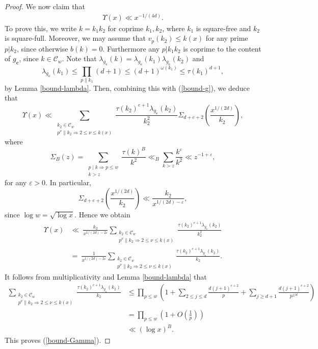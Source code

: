 \documentclass[reqno, 11pt]{amsart}
\renewcommand{\leq}{\leqslant}
\renewcommand{\geq}{\geqslant}
\theoremstyle{definition}
\theoremstyle{definition}
\renewcommand{\geq}{\geqslant}
\renewcommand{\leq}{\leqslant}
\newcommand{\eps}{\varepsilon}
\newcommand{\cc}{\mathbf{c}}
\newcommand{\CCC}{\mathcal{C}}
\numberwithin{equation}{section}
\begin{document}
\begin{proof}
    We now claim that
    \begin{align}\label{bound-Gamma}
    	\Upsilon(x) \ll x^{-1/(4d)}.
    \end{align}
    To prove this, we write $k = k_1k_2$ for coprime $k_1, k_2$, where $k_1$ is square-free and $k_2$ is square-full. Moreover, we may assume that $v_p(k_2) \leq k(x)$ for any prime $p | k_2$, since otherwise $b(k) = 0$. Furthermore any $p | k_1k_2$ is coprime to the content of $g_\cc$, since $k \in \CCC_w$. Note that $\lambda_{g_\cc}(k) = \lambda_{g_\cc}(k_1) \lambda_{g_\cc}(k_2)$ and
    $$\lambda_{g_\cc}(k_1) \leq \prod_{p \| k_1 }(d+1) \leq (d+1)^{\omega(k_1)} \leq \tau(k_1)^{d+1},$$
    by Lemma \ref{bound-lambda}. Then, combining this with (\ref{bound-g}), we deduce that
    $$\Upsilon(x)\ll \sum_{\substack{k_2\in \mathcal{C}_w\\p^\nu\| k_2\Rightarrow 2\leq \nu\leq k(x)}} \frac{\tau(k_2)^{e+1}\lambda_{g_\cc}(k_2)}{k_2^2} \Sigma_{d+e+2}\left(\frac{x^{1/(2d)}}{k_2}\right),$$
where 
$$
\Sigma_B(z)=\sum_{\substack{p\mid k \Rightarrow p\leq w\\ k>z}} \frac{\tau(k)^{B}}{k^2} \ll_B \sum_{k > z} \frac{k^\eps}{k^2} \ll z^{-1+\eps}, $$
for any $\eps > 0$.
In particular, 
$$\Sigma_{d+e+2}\left(\frac{x^{1/(2d)}}{k_2}\right) \ll \frac{k_2}{x^{1/(2d)-\eps}} ,$$
since $\log w = \sqrt{\log x}$. 
Hence we obtain
\begin{align*}
	\Upsilon(x) & \ll \ \frac{k_2}{x^{1/(2d) - 2\eps}} 
 \sum_{\substack{k_2\in \mathcal{C}_w\\
p^\nu\| k_2\Rightarrow 2\leq \nu\leq k(x)}}
 \frac{\tau(k_2)^{e+1}
\lambda_{g_\cc}(k_2)}{k_2^2} \\
 & = \ \frac{1}{x^{1/(2d) - 2\eps}} 
 \sum_{\substack{k_2\in \mathcal{C}_w\\
p^\nu\| k_2\Rightarrow 2\leq \nu\leq k(x)}}
 \frac{\tau(k_2)^{e+1}
\lambda_{g_\cc}(k_2)}{k_2}.
\end{align*}
It follows from multiplicativity and Lemma \ref{bound-lambda} that
\begin{align*}
	\sum_{\substack{k_2\in \mathcal{C}_w\\
p^\nu\| k_2\Rightarrow 2\leq \nu\leq k(x)}}
 \frac{\tau(k_2)^{e+1}
\lambda_{g_\cc}(k_2)}{k_2} & \leq \prod_{p \leq w} \left( 1 + \sum_{2 \leq j \leq d} \frac{d(j+1)^{e+2}}{p} + \sum_{j \geq d+1} \frac{d(j+1)^{e+2}}{p^{j/d}} \right) \\
& = \prod_{p \leq w} \left( 1 + O \left( \frac{1}{p} \right) \right) \\
& \ll (\log x)^B.
\end{align*}
This proves (\ref{bound-Gamma}).
    

\end{proof}
\end{document}
